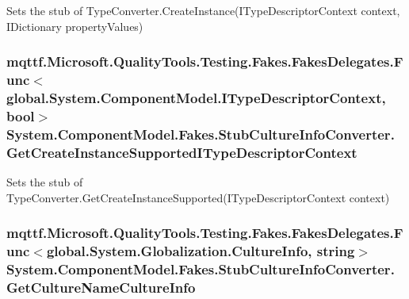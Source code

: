 Sets the stub of Type\-Converter.\-Create\-Instance(\-I\-Type\-Descriptor\-Context context, I\-Dictionary property\-Values)

\hypertarget{class_system_1_1_component_model_1_1_fakes_1_1_stub_culture_info_converter_a3d60a0bd2444961e1fa2920e4766d816}{
\subsubsection[{Get\-Create\-Instance\-Supported\-I\-Type\-Descriptor\-Context}]{\setlength{\rightskip}{0pt plus 5cm}mqttf.\-Microsoft.\-Quality\-Tools.\-Testing.\-Fakes.\-Fakes\-Delegates.\-Func$<$global.\-System.\-Component\-Model.\-I\-Type\-Descriptor\-Context, bool$>$ System.\-Component\-Model.\-Fakes.\-Stub\-Culture\-Info\-Converter.\-Get\-Create\-Instance\-Supported\-I\-Type\-Descriptor\-Context}}\label{class_system_1_1_component_model_1_1_fakes_1_1_stub_culture_info_converter_a3d60a0bd2444961e1fa2920e4766d816}


Sets the stub of Type\-Converter.\-Get\-Create\-Instance\-Supported(\-I\-Type\-Descriptor\-Context context)

\hypertarget{class_system_1_1_component_model_1_1_fakes_1_1_stub_culture_info_converter_adb13d263262e7300a7dbb3c192addcee}{
\subsubsection[{Get\-Culture\-Name\-Culture\-Info}]{\setlength{\rightskip}{0pt plus 5cm}mqttf.\-Microsoft.\-Quality\-Tools.\-Testing.\-Fakes.\-Fakes\-Delegates.\-Func$<$global.\-System.\-Globalization.\-Culture\-Info, string$>$ System.\-Component\-Model.\-Fakes.\-Stub\-Culture\-Info\-Converter.\-Get\-Culture\-Name\-Culture\-Info}}\label{class_system_1_1_component_model_1_1_fakes_1_1_stub_culture_info_converter_adb13d263262e7300a7dbb3c192addcee}


